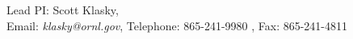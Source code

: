 \begin{center}
Lead PI: Scott Klasky, \ORNL\\
Email: \emph{klasky@ornl.gov}, Telephone: 865-241-9980 , Fax: 865-241-4811
\end{center}
